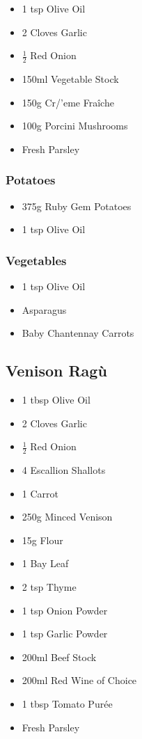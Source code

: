 \documentclass[11pt, english]{article}
\begin{document}
	\begin{itemize}
        \setlength\itemsep{0cm}
                \item 1 tsp Olive Oil
		\item 2 Cloves Garlic
		\item $\frac{1}{2}$ Red Onion
		\item 150ml Vegetable Stock 
		\item 150g Cr/'{e}me Fra\^{i}che
		\item 100g Porcini Mushrooms
		\item Fresh Parsley
        \end{itemize}

		\subsubsection*{Potatoes}

        \begin{itemize}
        \setlength\itemsep{0cm}
                \item 375g Ruby Gem Potatoes
		\item 1 tsp Olive Oil
        \end{itemize}

		\subsubsection*{Vegetables}

	\begin{itemize}
        \setlength\itemsep{0cm}
		\item 1 tsp Olive Oil
                \item Asparagus
		\item Baby Chantennay Carrots
        \end{itemize}

\newpage

	\subsection{Venison Rag\`{u}}

	\begin{itemize}
	\setlength\itemsep{0cm}
		\item 1 tbsp Olive Oil
		\item 2 Cloves Garlic
		\item $\frac{1}{2}$ Red Onion
		\item 4 Escallion Shallots
		\item 1 Carrot
		\item 250g Minced Venison 
		\item 15g Flour
		\item 1 Bay Leaf
		\item 2 tsp Thyme
		\item 1 tsp Onion Powder
		\item 1 tsp Garlic Powder
		\item 200ml Beef Stock
		\item 200ml Red Wine of Choice
		\item 1 tbsp Tomato Pur\'{e}e 
		\item Fresh Parsley
	\end{itemize}
\end{document}
